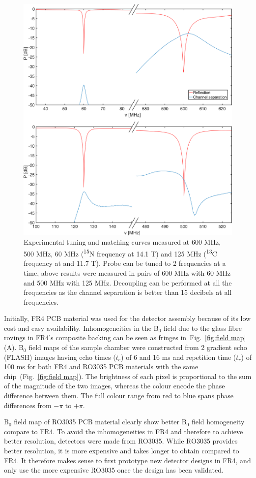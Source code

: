 \documentclass[preprint,5p]{elsarticle}
\newcommand{\fig}[1]{Fig.~\ref{#1}}
\begin{document}
\begin{figure} \centering
\includegraphics[width=.7\linewidth,keepaspectratio=true]{./figures/ms5n17-tlp-im-180710-tandm-sameaxis.png}
\caption{ Experimental tuning and matching curves measured at 600 MHz, 500 MHz,
60 MHz (\textsuperscript{15}N frequency at 14.1 T) and 125 MHz
(\textsuperscript{13}C frequency at  and 11.7 T). Probe can be tuned to 2
frequencies at a time, above results were measured in pairs of 600 MHz with 60
MHz and 500 MHz with 125 MHz. Decoupling can be performed at all the frequencies
as the channel separation is better than 15 decibels at all frequencies.}
\label{fig:tandm} \end{figure}
Initially, FR4 PCB material was used for the
detector assembly because of its low cost and easy availability. Inhomogeneities
in the B$_0$ field due to the glass fibre rovings in FR4's composite backing can
be seen as fringes in~\fig{fig:field map} (A). B$_{0}$ field maps of the sample
chamber were constructed from 2 gradient echo (FLASH) images having echo times
($t_{e}$) of 6 and 16 ms and repetition time ($t_{r}$) of 100 ms for both FR4
and RO3035 PCB materials with the same chip~(\fig{fig:field map}). The
brightness of each pixel is proportional to the sum of the magnitude of the two
images, whereas the colour encode the phase difference between them. The full
colour range from red to blue spans phase differences from $-\pi$ to $+\pi$.

B$_{0}$ field map of RO3035 PCB material clearly show better B$_{0}$ field homogeneity compare to FR4. To avoid the inhomogeneities in FR4 and therefore to achieve better resolution,
detectors were made from RO3035. While RO3035 provides better
resolution, it is more expensive and takes longer to obtain compared to FR4. It
therefore makes sense to first prototype new detector designs in FR4, and only
use the more expensive RO3035 once the design has been validated.
\end{document}
